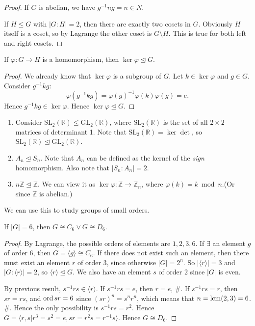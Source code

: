 \documentclass[a4paper]{article}
\begin{document}
    \begin{proof}
        If $G$ is abelian, we have $ g^{-1}ng=n\in N $.

        If $H\le G$ with $ |G:H|=2$, then there are exactly two cosets in $G$. Obviously $H$ itself is a coset, so by Lagrange the other coset is $ G \setminus H $. This is true for both left and right cosets.
    \end{proof}
    \begin{proposition}\label{prop:4.4}
        If $ \varphi:G\to H $ is a homomorphism, then $ \ker \varphi \trianglelefteq G $.
    \end{proposition}
    \begin{proof}
        We already know that $ \ker \varphi $ is a subgroup of $G$. Let $ k\in \ker \varphi $ and $g\in G$. Consider $ g^{-1}kg $:
        \[
            \varphi(g^{-1}kg)=\varphi(g)^{-1}\varphi(k) \varphi(g)=e
        .\]
        Hence $ g^{-1}kg\in \ker \varphi $. Hence $\ker \varphi \trianglelefteq G$.
    \end{proof}
    \begin{example}
        \begin{enumerate}[(1)]
            \item Consider $ \mathrm{SL}_2(\mathbb{R})\le \mathrm{GL_2}(\mathbb{R}) $, where $ \mathrm{SL}_2(\mathbb{R}) $ is the set of all $ 2 \times 2 $ matrices of determinant 1. Note that $ \mathrm{SL}_2(\mathbb{R}) = \ker \det $, so $ \mathrm{SL}_2(\mathbb{R})\trianglelefteq  \mathrm{GL_2}(\mathbb{R}) $.
            \item $ A_n\trianglelefteq S_n $. Note that $ A_n $ can be defined as the kernel of the \textit{sign} homomorphism. Also note that $ |S_n:A_n|=2 $.
            \item $ n \mathbb{Z} \trianglelefteq \mathbb{Z} $. We can view it as $ \ker \varphi: \mathbb{Z} \to \mathbb{Z}_n $, where $ \varphi(k)=k \bmod n $.(Or since $ \mathbb{Z} $ is abelian.)
        \end{enumerate}
    \end{example}
    We can use this to study groups of small orders.
    \begin{proposition}\label{prop:4.6}
        If $ |G|=6 $, then $ G \cong C_6 \lor G \cong D_6 $.
    \end{proposition}
    \begin{proof}
        By Lagrange, the possible orders of elements are $1,2,3,6$. If $ \exists $ an element $g$ of order 6, then $ G = \langle g \rangle \cong C_6 $. If there does not exist such an element, then there must exist an element $ r $ of order 3, since otherwise $|G|=2^n$. So $ |\langle r \rangle |=3 $ and $ |G:\langle r \rangle |=2 $, so $ \langle r \rangle \trianglelefteq G $. We also have an element $s$ of order 2 since $|G|$ is even. 
        
        By previous result, $ s^{-1}rs\in \langle r \rangle $. If $ s^{-1}rs=e $, then $ r=e $, \#. If $ s^{-1}rs=r $, then $sr=rs$, and $ \operatorname{ord} sr=6 $ since $ (sr)^n=s^nr^n $, which means that $ n=\operatorname{lcm}(2,3)=6 $. \#. Hence the only possibility is $ s^{-1}rs=r^2 $. Hence $ G=\langle r,s|r^3=s^2=e, sr=r^2s=r^{-1}s \rangle  $. Hence $ G \cong D_6 $.
    \end{proof}
\end{document}
